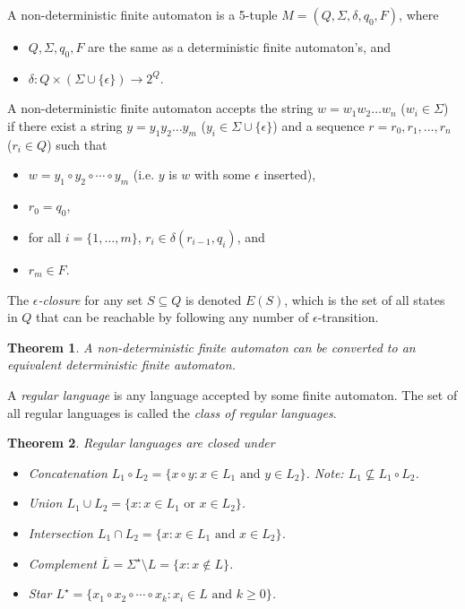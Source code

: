 \documentclass[letterpaper,landscape,11pt]{article}
\newtheorem{theorem}{Theorem}
\begin{document}
A non-deterministic finite automaton is a 5-tuple $M = (Q, \Sigma, \delta, q_0, F)$, where
\begin{itemize}
	\item $Q, \Sigma, q_0, F$ are the same as a deterministic finite automaton's, and
	\item $\delta : Q \times (\Sigma \cup \{\epsilon\}) \rightarrow 2^Q$.
\end{itemize}

A non-deterministic finite automaton accepts the string $w = w_1w_2 \dots w_n$ ($w_i \in \Sigma$) if there exist a string $y = y_1y_2 \dots y_m$ ($y_i \in \Sigma \cup \{\epsilon\}$) and a sequence $r = r_0, r_1, \dots, r_n$ ($r_i \in Q$) such that
\begin{itemize}
	\item $w = y_1 \circ y_2 \circ \cdots \circ y_m$ (i.e. $y$ is $w$ with some $\epsilon$ inserted),
	\item $r_0 = q_0$,
	\item for all $i = \{1, \dots, m\}$, $r_i \in \delta(r_{i-1}, q_i)$, and
	\item $r_m \in F$.
\end{itemize}

The \emph{$\epsilon$-closure} for any set $S \subseteq Q$ is denoted $E(S)$, which is the set of all states in $Q$ that can be reachable by following any number of $\epsilon$-transition.

\begin{theorem}
	A non-deterministic finite automaton can be converted to an equivalent deterministic finite automaton.
\end{theorem}

A \emph{regular language} is any language accepted by some finite automaton. The set of all regular languages is called the \emph{class of regular languages}.

\begin{theorem}
	Regular languages are closed under
	\begin{itemize}
		\item Concatenation $L_1 \circ L_2 = \{x \circ y : x \in L_1 \text{ and } y \in L_2\}$. Note: $L_1 \not\subseteq L_1 \circ L_2$.
		\item Union $L_1 \cup L_2 = \{x : x \in L_1 \text{ or } x \in L_2\}$.
		\item Intersection $L_1 \cap L_2 = \{x : x \in L_1 \text{ and } x \in L_2\}$.
		\item Complement $\overline{L} = \Sigma^\star \setminus L = \{x : x \notin L\}$.
		\item Star $L^\star = \{x_1 \circ x_2 \circ \cdots \circ x_k : x_i \in L \text{ and } k \geq 0\}$.
	\end{itemize}
\end{theorem}
\end{document}
